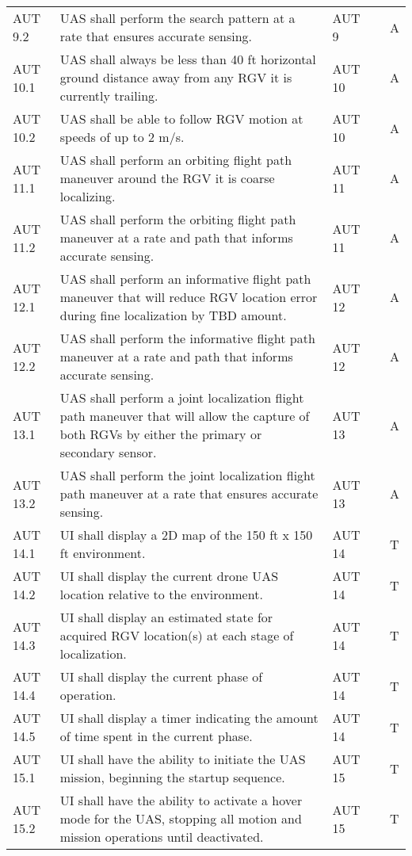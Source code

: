 \begin{tabular}{lllll}
AUT 9.2 & UAS shall perform the search pattern at a rate that ensures accurate sensing. & AUT 9 &  & A \\ 
AUT 10.1 & UAS shall always be less than 40 ft horizontal ground distance away from any RGV it is currently trailing. & AUT 10 &  & A \\ 
AUT 10.2 & UAS shall be able to follow RGV motion at speeds of up to 2 m/s. & AUT 10 &  & A \\ 
AUT 11.1 & UAS shall perform an orbiting flight path maneuver around the RGV it is coarse localizing. & AUT 11 &  & A \\ 
AUT 11.2 & UAS shall perform the orbiting flight path maneuver at a rate and path that informs accurate sensing. & AUT 11 &  & A \\ 
AUT 12.1 & UAS shall perform an informative flight path maneuver that will reduce RGV location error during fine localization by TBD amount. & AUT 12 &  & A \\ 
AUT 12.2 & UAS shall perform the informative flight path maneuver at a rate and path that informs accurate sensing. & AUT 12 &  & A \\ 
AUT 13.1 & UAS shall perform a joint localization flight path maneuver that will allow the capture of both RGVs by either the primary or secondary sensor. & AUT 13 &  & A \\ 
AUT 13.2 & UAS shall perform the joint localization flight path maneuver at a rate that ensures accurate sensing. & AUT 13 &  & A \\ 
AUT 14.1 & UI shall display a 2D map of the 150 ft x 150 ft environment. & AUT 14 &  & T \\ 
AUT 14.2 & UI shall display the current drone UAS location relative to the environment. & AUT 14 &  & T \\ 
AUT 14.3 & UI shall display an estimated state for acquired RGV location(s) at each stage of localization. & AUT 14 &  & T \\ 
AUT 14.4 & UI shall display the current phase of operation. & AUT 14 &  & T \\ 
AUT 14.5 & UI shall display a timer indicating the amount of time spent in the current phase. & AUT 14 &  & T \\ 
AUT 15.1 & UI shall have the ability to initiate the UAS mission, beginning the startup sequence. & AUT 15 &  & T \\ 
AUT 15.2 & UI shall have the ability to activate a hover mode for the UAS, stopping all motion and mission operations until deactivated. & AUT 15 &  & T \\ 

\end{tabular}
